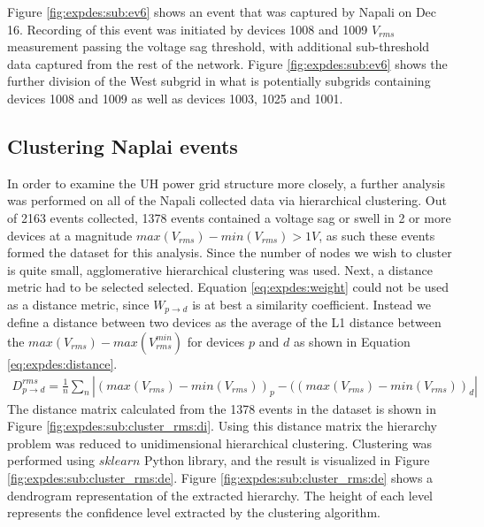 Figure \ref{fig:expdes:sub:ev6} shows an event that was captured by Napali on Dec 16.
Recording of this event was initiated by devices 1008 and 1009 $V_{rms}$ measurement passing the voltage sag threshold, with additional sub-threshold data captured from the rest of the network.
Figure \ref{fig:expdes:sub:ev6} shows the further division of the West subgrid in what is potentially subgrids containing devices 1008 and 1009 as well as devices 1003, 1025 and 1001.

\subsection{Clustering Naplai events}\label{subsec:clustering-naplai-events}

In order to examine the UH power grid structure more closely, a further analysis was performed on all of the Napali collected data via hierarchical clustering.
Out of 2163 events collected, 1378 events contained a voltage sag or swell in 2 or more devices at a magnitude $max(V_{rms})- min(V_{rms}) > 1V$, as such these events formed the dataset for this analysis.
Since the number of nodes we wish to cluster is quite small, agglomerative hierarchical clustering was used.
Next, a distance metric had to be selected selected.
Equation \ref{eq:expdes:weight} could not be used as a distance metric, since  $W_{p \rightarrow d}$ is at best a similarity coefficient.
Instead we define a distance between two devices as the average of the L1 distance between the $max(V_{rms})- max(V_{rms}^{min})$ for devices $p$ and $d$ as shown in Equation \ref{eq:expdes:distance}.
\begin{equation} \label{eq:expdes:distance}
\begin{aligned}
    D_{p \rightarrow d}^{rms} = \frac{1}{n}\sum_{n}|(max(V_{rms}) - min(V_{rms}))_{p} - ((max(V_{rms}) - min(V_{rms}))_{d}|
\end{aligned}
\end{equation}
The distance matrix calculated from the 1378 events in the dataset is shown in Figure \ref{fig:expdes:sub:cluster_rms:di}.
Using this distance matrix the hierarchy problem was reduced to unidimensional hierarchical clustering.
Clustering was performed using $sklearn$ Python library, and the result is visualized in Figure \ref{fig:expdes:sub:cluster_rms:de}.
Figure \ref{fig:expdes:sub:cluster_rms:de} shows a dendrogram representation of the extracted hierarchy.
The height of each level represents the confidence level extracted by the clustering algorithm.
